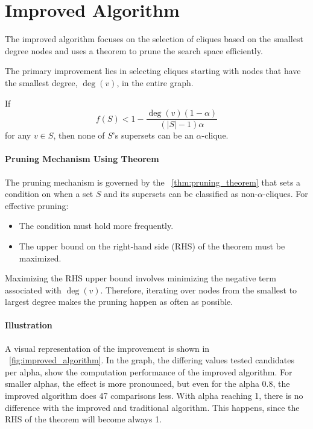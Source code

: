 \section{Improved Algorithm}

The improved algorithm focuses on the selection of cliques based on the smallest degree nodes and uses a theorem to prune the search space efficiently.

The primary improvement lies in selecting cliques starting with nodes that have the smallest degree, \( \deg(v) \), in the entire graph.
\begin{theorem}
    \label{thm:pruning_theorem} %
    If
    \[
        f(S) < 1 - \frac{\deg(v) (1 - \alpha)}{(|S| - 1) \alpha}
    \]
    for any \( v \in S \), then none of \( S \)'s supersets can be an \( \alpha \)-clique.
\end{theorem}

\paragraph{Pruning Mechanism Using Theorem}
The pruning mechanism is governed by the ~\autoref{thm:pruning_theorem} that sets a condition on when a set \( S \) and its supersets can be classified as non-\( \alpha \)-cliques. For effective pruning:
\begin{itemize}
    \item The condition must hold more frequently.
    \item The upper bound on the right-hand side (RHS) of the theorem must be maximized.
\end{itemize}
Maximizing the RHS upper bound involves minimizing the negative term associated with \( \deg(v) \). Therefore, iterating over nodes from the smallest to largest degree makes the pruning happen as often as possible.

\paragraph{Illustration}
A visual representation of the improvement is shown in  ~\autoref{fig:improved_algorithm}. In the graph, the differing values tested candidates per alpha, show the computation performance of the improved algorithm. For smaller alphas, the effect is more pronounced, but even for the alpha 0.8, the improved algorithm does 47 comparisons less. With alpha reaching 1, there is no difference with the improved and traditional algorithm. This happens, since the RHS of the theorem will become always 1.

